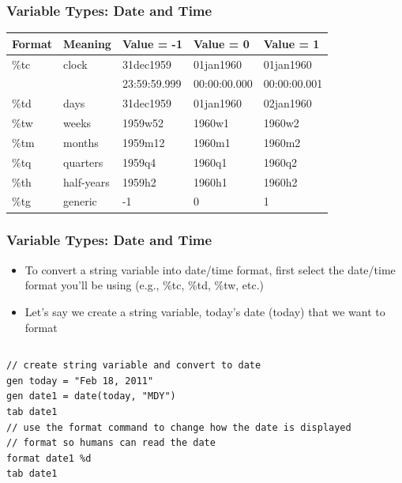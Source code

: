 \documentclass[table]{beamer}
\begin{document}
\begin{frame}
\frametitle{Variable Types: Date and Time}
\label{sec-5-6}



\begin{center}
\begin{tabular}{lllll}
 Format  &  Meaning     &  Value = -1    &  Value = 0     &  Value = 1     \\
\hline
 \%tc    &  clock       &  31dec1959     &  01jan1960     &  01jan1960     \\
         &              &  23:59:59.999  &  00:00:00.000  &  00:00:00.001  \\
 \%td    &  days        &  31dec1959     &  01jan1960     &  02jan1960     \\
 \%tw    &  weeks       &  1959w52       &  1960w1        &  1960w2        \\
 \%tm    &  months      &  1959m12       &  1960m1        &  1960m2        \\
 \%tq    &  quarters    &  1959q4        &  1960q1        &  1960q2        \\
 \%th    &  half-years  &  1959h2        &  1960h1        &  1960h2        \\
 \%tg    &  generic     &  -1            &  0             &  1             \\
\end{tabular}
\end{center}
\end{frame}
\begin{frame}[fragile]
\frametitle{Variable Types: Date and Time}
\label{sec-5-7}

\begin{itemize}
\item To convert a string variable into date/time
  format, first select the date/time format you'll
  be using (e.g., \%tc, \%td, \%tw, etc.)
\item Let's say we create a string variable, today's
  date (today) that we want to format
\end{itemize}

\vspace{-.5em} \begin{columns}  \begin{block}{}


\begin{verbatim}
// create string variable and convert to date
gen today = "Feb 18, 2011"
gen date1 = date(today, "MDY")
tab date1
// use the format command to change how the date is displayed
// format so humans can read the date
format date1 %d
tab date1
\end{verbatim}
\end{block} \end{columns}
\end{frame}
\end{document}
